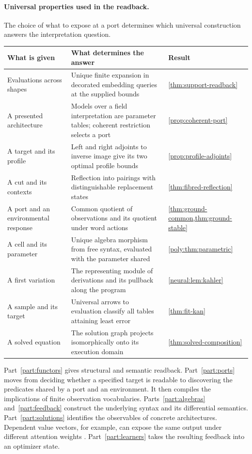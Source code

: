 \documentclass[11pt,a4paper]{article}
\theoremstyle{definition}
\theoremstyle{remark}\newaliascnt{remark}{theorem}
\numberwithin{equation}{section}
\begin{document}
\paragraph{Universal properties used in the readback.}
The choice of what to expose at a port determines which universal construction answers the interpretation question.
\begin{center}
\small
\begin{tabular}{@{}p{.29\linewidth}p{.46\linewidth}p{.17\linewidth}@{}}
\toprule
What is given & What determines the answer & Result\\
\midrule
Evaluations across shapes & Unique finite expansion in decorated embedding queries at the supplied bounds & \cref{thm:support-readback}\\[2pt]

A presented architecture & Models over a field interpretation are parameter tables; coherent restriction selects a port & \cref{prop:coherent-port}\\[2pt]
A target and its profile & Left and right adjoints to inverse image give its two optimal profile bounds & \cref{prop:profile-adjoints}\\[2pt]
A cut and its contexts & Reflection into pairings with distinguishable replacement states & \cref{thm:fibred-reflection}\\[2pt]
A port and an environmental response & Common quotient of observations and its quotient under word actions & \cref{thm:ground-common,thm:ground-stable}\\[2pt]
A cell and its parameter & Unique algebra morphism from free syntax, evaluated with the parameter shared & \cref{poly:thm:parametric}\\[2pt]
A first variation & The representing module of derivations and its pullback along the program & \cref{neural:lem:kahler}\\[2pt]
A sample and its target & Universal arrows to evaluation classify all tables attaining least error & \cref{thm:fit-kan}\\[2pt]

A solved equation & The solution graph projects isomorphically onto its execution domain & \cref{thm:solved-composition}\\
\bottomrule
\end{tabular}
\end{center}
Part~\ref{part:functors} gives structural and semantic readback. Part~\ref{part:ports} moves from deciding whether a specified target is readable to discovering the predicates shared by a port and an environment. It then compiles the implications of finite observation vocabularies. Parts~\ref{part:algebras} and~\ref{part:feedback} construct the underlying syntax and its differential semantics. Part~\ref{part:solutions} identifies the observables of concrete architectures. Dependent value vectors, for example, can expose the same output under different attention weights \cite{attn-identifiability}. Part~\ref{part:learners} takes the resulting feedback into an optimizer state.
\end{document}

